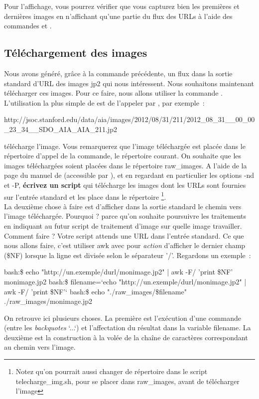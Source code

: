 Pour l'affichage, vous pourrez vérifier que vous capturez bien les premières et dernières images en n'affichant qu'une partie du flux des URLs à l'aide des commandes \head et \tail.

\subsection{Téléchargement des images}

Nous avons généré, grâce à la commande précédente, un flux dans la sortie standard d'URL des images jp2 qui nous intéressent. Nous souhaitons maintenant télécharger ces images. Pour ce faire, nous allons utiliser la commande . L'utilisation la plus simple de  est de l'appeler par , par exemple~:
\begin{center}
\wget http://jsoc.stanford.edu/data/aia/images/2012/08/31/211/2012\_08\_31\_\_00\_00\_23\_34\_\_SDO\_AIA\_AIA\_211.jp2
\end{center}
télécharge l'image. Vous remarquerez que l'image téléchargée est placée dans le répertoire d'appel de la commande, le répertoire courant. On souhaite que les images téléchargées soient placées dans le répertoire raw\_images. A l'aide de la page du manuel de \wget (accessible par ), et en regardant en particulier les options -nd et -P, \textbf{écrivez un script}  qui télécharge les images dont les URLs sont fournies sur l'entrée standard et les place dans le répertoire \footnote{Notez qu'on pourrait aussi changer de répertoire dans le script telecharge\_img.sh, pour se placer dans raw\_images, avant de télécharger l'image}.\\

La deuxième chose à faire est d'afficher dans la sortie standard le chemin vers l'image téléchargée. Pourquoi ? parce qu'on souhaite poursuivre les traitements en indiquant au futur script de traitement d'image sur quelle image travailler. Comment faire ? Votre script  attends une URL dans l'entrée standard. Ce que nous allons faire, c'est utiliser awk avec pour \emph{action} d'afficher le dernier champ (\$NF) lorsque la ligne est divisée selon le séparateur '/'. Regardons un exemple~:
\begin{exempleResultat}
bash:\$ echo "http://un.exemple/durl/monimage.jp2" | awk -F/ '{print \$NF}'
monimage.jp2
bash:\$ filename=`echo "http://un.exemple/durl/monimage.jp2" | awk -F/ '{print \$NF}'`
bash:\$ echo "./raw\_images/\$filename"
./raw\_images/monimage.jp2
\end{exempleResultat}
On retrouve ici plusieurs choses. La première est l'exécution d'une commande (entre les \emph{backquotes} `...`) et l'affectation du résultat dans la variable filename. La deuxième est la construction à la volée de la chaîne de caractères correspondant au chemin vers l'image.\\

